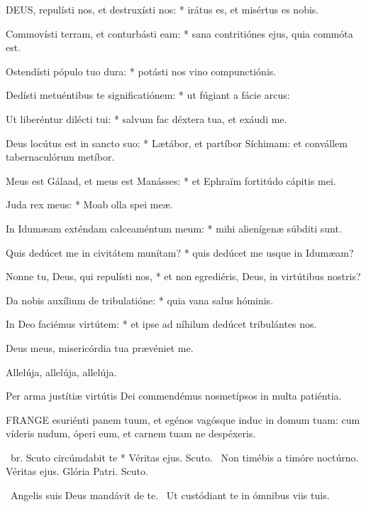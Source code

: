 
\lettrine[lines=2]{D}{EUS}, repulísti nos, et destruxísti nos: * irátus es, et misértus es nobis.

Commovísti terram, et conturbásti eam: * sana contritiónes ejus, quia commóta est.

Ostendísti pópulo tuo dura: * potásti nos vino compunctiónis.

Dedísti metuéntibus te significatiónem: * ut fúgiant a fácie arcus:

Ut liberéntur dilécti tui: * salvum fac déxtera tua, et exáudi me.

Deus locútus est in sancto suo: * Lætábor, et partíbor Síchimam: et convállem tabernaculórum metíbor.

Meus est Gálaad, et meus est Manásses: * et Ephraïm fortitúdo cápitis mei.

Juda rex meus: * Moab olla spei meæ.

In Idumæam exténdam calceaméntum meum: * mihi alienígenæ súbditi sunt.

Quis dedúcet me in civitátem munítam? * quis dedúcet me usque in Idumæam?

Nonne tu, Deus, qui repulísti nos, * et non egrediéris, Deus, in virtútibus nostris?

Da nobis auxílium de tribulatióne: * quia vana salus hóminis.

In Deo faciémus virtútem: * et ipse ad níhilum dedúcet tribulántes nos.

  Deus meus, misericórdia tua prævéniet me.

  Allelúja, allelúja, allelúja.



 Per arma justítiæ virtútis Dei commendémus nosmetípsos in multa patiéntia.


\lettrine[lines=2]{F}{RANGE} esuriénti panem tuum, et egénos vagósque induc in domum tuam: cum víderis nudum, óperi eum, et carnem tuam ne despéxeris.

\R\ br. Scuto circúmdabit te * Véritas ejus. Scuto. \V\ Non timébis a timóre noctúrno. Véritas ejus. Glória Patri. Scuto.

\V\ Angelis suis Deus mandávit de te. \R\ Ut custódiant te in ómnibus viis tuis.

